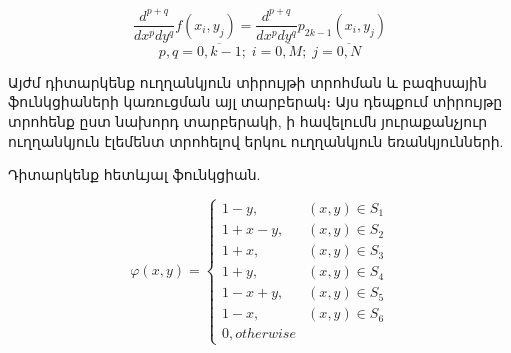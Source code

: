\documentclass[fleqn, bachelor,subf,12pt,notitlepage]{disser}
\begin{document}
$$ \dfrac{d^{p+q}}{dx^p dy^{q}}f(x_{i}, y_{j})=\dfrac{d^{p+q}}{dx^{p}dy^{q}}p_{2k-1}(x_{i}, y_{j})$$
$$p, q = \overline{0, k-1}; \; i=\overline{0, M};  \;  j=\overline{0, N}$$


\newpage

\noindent Այժմ դիտարկենք ուղղանկյուն տիրույթի տրոհման և բազիսային ֆունկցիաների կառուցման այլ տարբերակ։ Այս դեպքում տիրույթը տրոհենք ըստ նախորդ տարբերակի, ի հավելումն յուրաքանչյուր ուղղանկյուն էլեմենտ տրոհելով երկու ուղղանկյուն եռանկյունների.

Դիտարկենք հետևյալ ֆունկցիան.

$$\varphi \left(x,y\right)=\begin{cases}
1-y, &(x,y) \in S_{1} \\
1+x-y, &(x,y) \in S_{2} \\
1+x, &(x,y) \in S_{3} \\
1+y, &(x,y) \in S_{4} \\
1-x+y, &(x,y) \in S_{5} \\
1-x, &(x,y) \in S_{6}\\
0, otherwise
\end{cases} $$
\end{document}
